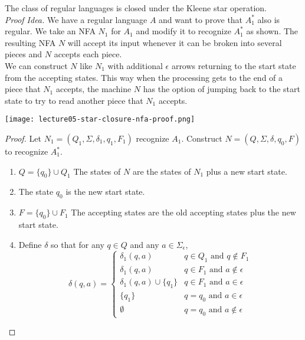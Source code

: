 \documentclass[11pt,a4paper]{article}
\begin{document}
\begin{theorem}
    The class of regular languages is closed under the Kleene star operation. \\

    \textit{Proof Idea.} We have a regular language $A$ and want to prove that $A_1^*$ also is regular. We take an NFA $N_1$ for $A_1$ and modify it to recognize $A_1^*$ as shown.
    The resulting NFA $N$ will accept its input whenever it can be broken into several pieces and $N$ accepts each piece. \\

    We can construct $N$ like $N_1$ with additional $\epsilon$ arrows returning to the start state from the accepting states.
    This way when the processing gets to the end of a piece that $N_1$ accepts, the machine $N$ has the option of jumping back to the start state to try to read another piece that $N_1$ accepts.

    \texttt{[image: lecture05-star-closure-nfa-proof.png]}

    \begin{proof}
        Let $N_1=(Q_1,\Sigma,\delta_1,q_1,F_1)$ recognize $A_1$. Construct $N=(Q,\Sigma,\delta,q_0,F)$ to recognize $A_1^*$.

        \begin{enumerate}
            \item $Q=\{q_0\}\cup Q_1$
            \subitem The states of $N$ are the states of $N_1$ plus a new start state.
            \item The state $q_0$ is the new start state.
            \item $F=\{q_0\}\cup F_1$
            \subitem The accepting states are the old accepting states plus the new start state.
            \item Define $\delta$ so that for any $q\in Q$ and any $a\in\Sigma_{\epsilon}$,
            $$\delta(q,a)=\begin{cases}
                \delta_1(q,a) & q\in Q_1\text{ and }q\notin F_1 \\
                \delta_1(q,a) & q\in F_1\text{ and }a\notin\epsilon \\
                \delta_1(q,a)\cup\{q_1\} & q\in F_1\text{ and }a\in\epsilon \\
                \{q_1\} & q=q_0\text{ and }a\in\epsilon \\
                \emptyset & q=q_0\text{ and }a\notin\epsilon
            \end{cases}
            $$
        \end{enumerate}
    \end{proof}
\end{theorem}
\end{document}
